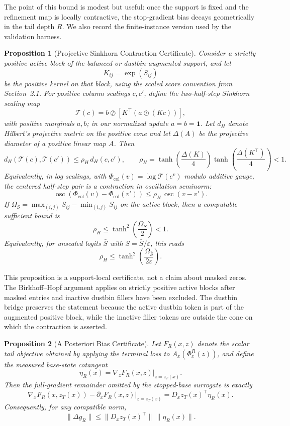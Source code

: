 \documentclass{article}
\newtheorem{proposition}{Proposition}
\begin{document}
The point of this bound is modest but useful: once the support is fixed and the refinement map is locally contractive, the stop-gradient bias decays geometrically in the tail depth $R$. We also record the finite-instance version used by the validation harness.

\begin{proposition}[Projective Sinkhorn Contraction Certificate]\label{prop:projective_contraction}
Consider a strictly positive active block of the balanced or dustbin-augmented support, and let
\[
K_{ij}=\exp(S_{ij})
\]
be the positive kernel on that block, using the scaled score convention from Section~2.1. For positive column scalings $c,c'$, define the two-half-step Sinkhorn scaling map
\[
\mathcal{T}(c)
=
b\oslash
\left[
K^\top
\left(a\oslash(Kc)\right)
\right],
\]
with positive marginals $a,b$; in our normalized update $a=b=\mathbf{1}$. Let $d_H$ denote Hilbert's projective metric on the positive cone and let $\Delta(A)$ be the projective diameter of a positive linear map $A$. Then
\[
d_H(\mathcal{T}(c),\mathcal{T}(c'))
\le
\rho_H\,d_H(c,c'),
\qquad
\rho_H
=
\tanh\!\left(\frac{\Delta(K)}{4}\right)
\tanh\!\left(\frac{\Delta(K^\top)}{4}\right)
<1.
\]
Equivalently, in log scalings, with $\Phi_{\mathrm{col}}(v)=\log \mathcal{T}(e^v)$ modulo additive gauge, the centered half-step pair is a contraction in oscillation seminorm:
\[
\operatorname{osc}\!\left(\Phi_{\mathrm{col}}(v)-\Phi_{\mathrm{col}}(v')\right)
\le
\rho_H\,\operatorname{osc}(v-v').
\]
If $\Omega_S=\max_{(i,j)}S_{ij}-\min_{(i,j)}S_{ij}$ on the active block, then a computable sufficient bound is
\[
\rho_H\le \tanh^2\!\left(\frac{\Omega_S}{2}\right)<1.
\]
Equivalently, for unscaled logits $\bar S$ with $S=\bar S/\varepsilon$, this reads
\[
\rho_H\le \tanh^2\!\left(\frac{\Omega_{\bar S}}{2\varepsilon}\right).
\]
\end{proposition}

This proposition is a support-local certificate, not a claim about masked zeros. The Birkhoff--Hopf argument \citep{birkhoff1957extensions,bushell1973hilbert} applies on strictly positive active blocks after masked entries and inactive dustbin fillers have been excluded. The dustbin bridge preserves the statement because the active dustbin token is part of the augmented positive block, while the inactive filler tokens are outside the cone on which the contraction is asserted.

\begin{proposition}[A Posteriori Bias Certificate]\label{prop:bias_certificate}
Let $F_R(x,z)$ denote the scalar tail objective obtained by applying the terminal loss to $A_x(\Phi_x^R(z))$, and define the measured base-state cotangent
\[
\eta_R(x)=\nabla_z F_R(x,z)\big|_{z=z_T(x)}.
\]
Then the full-gradient remainder omitted by the stopped-base surrogate is exactly
\[
\nabla_x F_R(x,z_T(x))
-
\partial_xF_R(x,z)\big|_{z=z_T(x)}
=
D_xz_T(x)^\top \eta_R(x).
\]
Consequently, for any compatible norm,
\[
\|\Delta g_R\|\le \|D_xz_T(x)^\top\|\,\|\eta_R(x)\|.
\]
\end{proposition}
\end{document}
